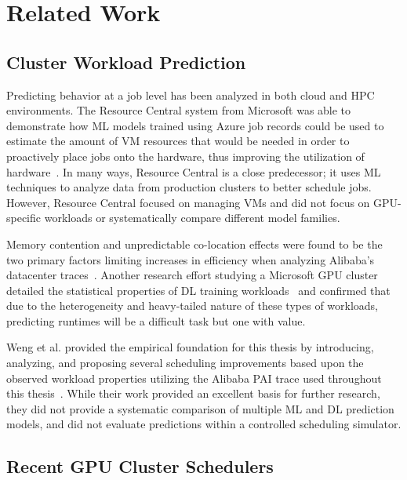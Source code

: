 \section{Related Work}

\subsection{Cluster Workload Prediction}

Predicting behavior at a job level has been analyzed in both cloud and HPC environments. The Resource Central system from Microsoft was able to demonstrate how ML models trained using Azure job records could be used to estimate the amount of VM resources that would be needed in order to proactively place jobs onto the hardware, thus improving the utilization of hardware~\cite{cortez2017resource}. In many ways, Resource Central is a close predecessor; it uses ML techniques to analyze data from production clusters to better schedule jobs. However, Resource Central focused on managing VMs and did not focus on GPU-specific workloads or systematically compare different model families.

Memory contention and unpredictable co-location effects were found to be the two primary factors limiting increases in efficiency when analyzing Alibaba's datacenter traces~\cite{guo2019limits}. Another research effort studying a Microsoft GPU cluster detailed the statistical properties of DL training workloads~\cite{jeon2019analysis} and confirmed that due to the heterogeneity and heavy-tailed nature of these types of workloads, predicting runtimes will be a difficult task but one with value.

Weng et al. provided the empirical foundation for this thesis by introducing, analyzing, and proposing several scheduling improvements based upon the observed workload properties utilizing the Alibaba PAI trace used throughout this thesis~\cite{weng2022mlaas}. While their work provided an excellent basis for further research, they did not provide a systematic comparison of multiple ML and DL prediction models, and did not evaluate predictions within a controlled scheduling simulator.

\newpage
\subsection{Recent GPU Cluster Schedulers}

